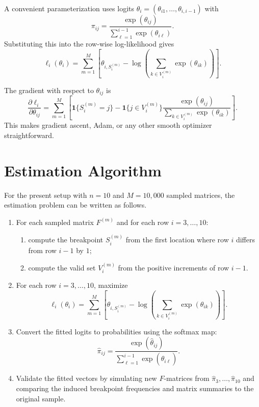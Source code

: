 \documentclass[11pt]{article}
\begin{document}
A convenient parameterization uses logits $\theta_i = (\theta_{i1}, \ldots,
\theta_{i,i-1})$ with
\[
\pi_{ij}
=
\frac{\exp(\theta_{ij})}
{\sum_{\ell=1}^{i-1} \exp(\theta_{i\ell})}.
\]
Substituting this into the row-wise log-likelihood gives
\[
\ell_i(\theta_i)
=
\sum_{m=1}^M
\left[
\theta_{i,S_i^{(m)}}
-
\log\left(
\sum_{k \in V_i^{(m)}} \exp(\theta_{ik})
\right)
\right].
\]

The gradient with respect to $\theta_{ij}$ is
\[
\frac{\partial \ell_i}{\partial \theta_{ij}}
=
\sum_{m=1}^M
\left[
\mathbf{1}\{S_i^{(m)} = j\}
-
\mathbf{1}\{j \in V_i^{(m)}\}
\frac{\exp(\theta_{ij})}
{\sum_{k \in V_i^{(m)}} \exp(\theta_{ik})}
\right].
\]
This makes gradient ascent, Adam, or any other smooth optimizer straightforward.

\section{Estimation Algorithm}

For the present setup with $n=10$ and $M=10{,}000$ sampled matrices, the
estimation problem can be written as follows.

\begin{enumerate}[leftmargin=2em]
    \item For each sampled matrix $F^{(m)}$ and for each row $i = 3, \ldots, 10$:
    \begin{enumerate}[label=(\alph*), leftmargin=2em]
        \item compute the breakpoint $S_i^{(m)}$ from the first location where
        row $i$ differs from row $i-1$ by $1$;
        \item compute the valid set $V_i^{(m)}$ from the positive increments of
        row $i-1$.
    \end{enumerate}
    \item For each row $i = 3, \ldots, 10$, maximize
    \[
    \ell_i(\theta_i)
    =
    \sum_{m=1}^M
    \left[
    \theta_{i,S_i^{(m)}}
    -
    \log\left(
    \sum_{k \in V_i^{(m)}} \exp(\theta_{ik})
    \right)
    \right].
    \]
    \item Convert the fitted logits to probabilities using the softmax map:
    \[
    \widehat{\pi}_{ij}
    =
    \frac{\exp(\widehat{\theta}_{ij})}
    {\sum_{\ell=1}^{i-1} \exp(\widehat{\theta}_{i\ell})}.
    \]
    \item Validate the fitted vectors by simulating new $F$-matrices from
    $\widehat{\pi}_3, \ldots, \widehat{\pi}_{10}$ and comparing the induced
    breakpoint frequencies and matrix summaries to the original sample.
\end{enumerate}
\end{document}
